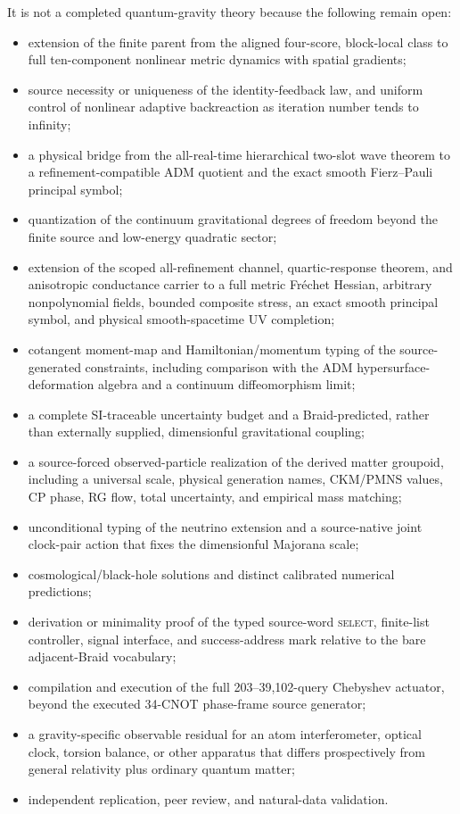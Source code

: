 \documentclass[11pt]{article}
\theoremstyle{definition}
\theoremstyle{remark}
\begin{document}
It is not a completed quantum-gravity theory because the following remain open:
\par\medskip
\begin{itemize}
\item extension of the finite parent from the aligned four-score, block-local class to full ten-component nonlinear metric dynamics with spatial gradients;
\item source necessity or uniqueness of the identity-feedback law, and uniform control of nonlinear adaptive backreaction as iteration number tends to infinity;
\item a physical bridge from the all-real-time hierarchical two-slot wave theorem to a refinement-compatible ADM quotient and the exact smooth Fierz--Pauli principal symbol;
\item quantization of the continuum gravitational degrees of freedom beyond the finite source and low-energy quadratic sector;
\item extension of the scoped all-refinement channel, quartic-response theorem, and anisotropic conductance carrier to a full metric Fr\'echet Hessian, arbitrary nonpolynomial fields, bounded composite stress, an exact smooth principal symbol, and physical smooth-spacetime UV completion;
\item cotangent moment-map and Hamiltonian/momentum typing of the source-generated constraints, including comparison with the ADM hypersurface-deformation algebra and a continuum diffeomorphism limit;
\item a complete SI-traceable uncertainty budget and a Braid-predicted, rather than externally supplied, dimensionful gravitational coupling;
\item a source-forced observed-particle realization of the derived matter groupoid, including a universal scale, physical generation names, CKM/PMNS values, CP phase, RG flow, total uncertainty, and empirical mass matching;
\item unconditional typing of the neutrino extension and a source-native joint clock-pair action that fixes the dimensionful Majorana scale;
\item cosmological/black-hole solutions and distinct calibrated numerical predictions;
\item derivation or minimality proof of the typed source-word \textsc{select}, finite-list controller, signal interface, and success-address mark relative to the bare adjacent-Braid vocabulary;
\item compilation and execution of the full 203--39,102-query Chebyshev actuator, beyond the executed 34-CNOT phase-frame source generator;
\item a gravity-specific observable residual for an atom interferometer, optical clock, torsion balance, or other apparatus that differs prospectively from general relativity plus ordinary quantum matter;
\item independent replication, peer review, and natural-data validation.
\end{itemize}
\end{document}
